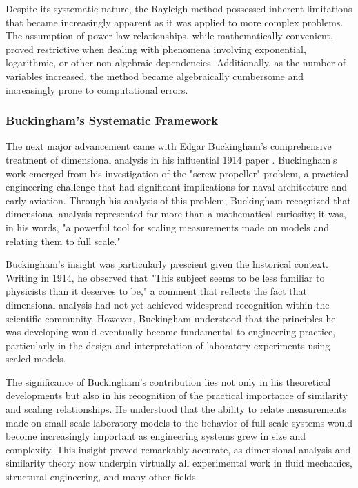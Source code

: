 \documentclass[
	11pt, %
	fleqn, %
	a4paper, %
]{LegrandOrangeBook}
\begin{document}
Despite its systematic nature, the Rayleigh method possessed inherent limitations that became increasingly apparent as it was applied to more complex problems. The assumption of power-law relationships, while mathematically convenient, proved restrictive when dealing with phenomena involving exponential, logarithmic, or other non-algebraic dependencies. Additionally, as the number of variables increased, the method became algebraically cumbersome and increasingly prone to computational errors.

\subsubsection{Buckingham's Systematic Framework}

The next major advancement came with Edgar Buckingham's comprehensive treatment of dimensional analysis in his influential 1914 paper \cite{buckingham1914}. Buckingham's work emerged from his investigation of the "screw propeller" problem, a practical engineering challenge that had significant implications for naval architecture and early aviation. Through his analysis of this problem, Buckingham recognized that dimensional analysis represented far more than a mathematical curiosity; it was, in his words, "a powerful tool for scaling measurements made on models and relating them to full scale."

Buckingham's insight was particularly prescient given the historical context. Writing in 1914, he observed that "This subject seems to be less familiar to physicists than it deserves to be," a comment that reflects the fact that dimensional analysis had not yet achieved widespread recognition within the scientific community. However, Buckingham understood that the principles he was developing would eventually become fundamental to engineering practice, particularly in the design and interpretation of laboratory experiments using scaled models.

The significance of Buckingham's contribution lies not only in his theoretical developments but also in his recognition of the practical importance of similarity and scaling relationships. He understood that the ability to relate measurements made on small-scale laboratory models to the behavior of full-scale systems would become increasingly important as engineering systems grew in size and complexity. This insight proved remarkably accurate, as dimensional analysis and similarity theory now underpin virtually all experimental work in fluid mechanics, structural engineering, and many other fields.
\end{document}
